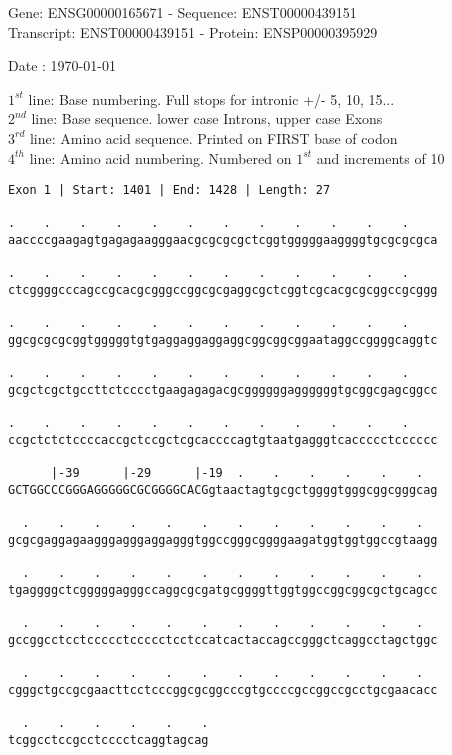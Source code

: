 \documentclass{article}
\begin{document}
\begin{center}
\begin{large}
Gene: ENSG00000165671 - Sequence: ENST00000439151\\
Transcript: ENST00000439151 - Protein: ENSP00000395929
 
 Date : \today
\end{large}
\end{center}
$1^{st}$ line: Base numbering. Full stops for intronic +/- 5, 10, 15...\\
$2^{nd}$ line: Base sequence. lower case Introns, upper case Exons\\
$3^{rd}$ line: Amino acid sequence. Printed on FIRST base of codon\\
$4^{th}$ line: Amino acid numbering. Numbered on $1^{st}$ and increments of 10\\
\begin{Verbatim}
Exon 1 | Start: 1401 | End: 1428 | Length: 27
 
.    .    .    .    .    .    .    .    .    .    .    .    
aaccccgaagagtgagagaagggaacgcgcgcgctcggtgggggaaggggtgcgcgcgca
  
.    .    .    .    .    .    .    .    .    .    .    .    
ctcggggcccagccgcacgcgggccggcgcgaggcgctcggtcgcacgcgcggccgcggg
  
.    .    .    .    .    .    .    .    .    .    .    .    
ggcgcgcgcggtgggggtgtgaggaggaggaggcggcggcggaataggccggggcaggtc
  
.    .    .    .    .    .    .    .    .    .    .    .    
gcgctcgctgccttctcccctgaagagagacgcggggggaggggggtgcggcgagcggcc
  
.    .    .    .    .    .    .    .    .    .    .    .    
ccgctctctccccaccgctccgctcgcaccccagtgtaatgagggtcaccccctcccccc
  
      |-39      |-29      |-19  .    .    .    .    .    .  
GCTGGCCCGGGAGGGGGCGCGGGGCACGgtaactagtgcgctggggtgggcggcgggcag
  
  .    .    .    .    .    .    .    .    .    .    .    .  
gcgcgaggagaagggagggaggagggtggccgggcggggaagatggtggtggccgtaagg
  
  .    .    .    .    .    .    .    .    .    .    .    .  
tgaggggctcgggggagggccaggcgcgatgcggggttggtggccggcggcgctgcagcc
  
  .    .    .    .    .    .    .    .    .    .    .    .  
gccggcctcctccccctccccctcctccatcactaccagccgggctcaggcctagctggc
  
  .    .    .    .    .    .    .    .    .    .    .    .  
cgggctgccgcgaacttcctcccggcgcggcccgtgccccgccggccgcctgcgaacacc
  
  .    .    .    .    .    .
tcggcctccgcctcccctcaggtagcag
\end{Verbatim}
\end{document}
